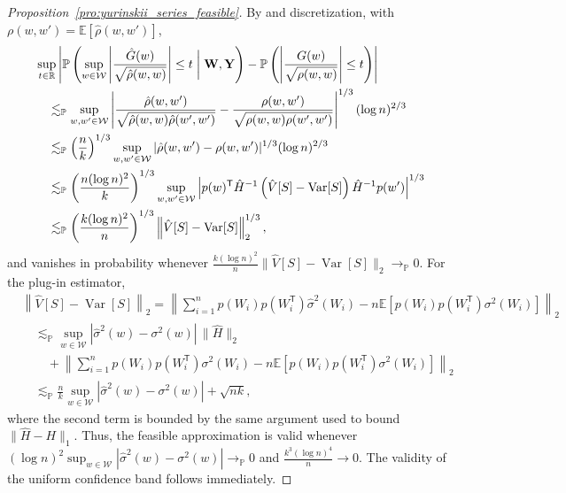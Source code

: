 \documentclass[11pt,lof]{puthesis}
\renewcommand{\P}{\ensuremath{\mathbb{P}}}
\newcommand{\R}{\ensuremath{\mathbb{R}}}
\newcommand{\E}{\ensuremath{\mathbb{E}}}
\newcommand{\bW}{\ensuremath{\mathbf{W}}}
\newcommand{\bY}{\ensuremath{\mathbf{Y}}}
\newcommand{\cW}{\ensuremath{\mathcal{W}}}
\newcommand{\T}{\ensuremath{\mathsf{T}}}
\DeclareMathOperator{\Var}{Var}
\theoremstyle{break}
\theoremstyle{proof}
\newtheorem{proof}{Proof}
\begin{document}
\begin{proof}[Proposition~\ref{pro:yurinskii_series_feasible}]
  By \citet[Lemma~3.1]{chernozhukov2013gaussian} and discretization,
  with $\rho(w,w') = \E[\hat\rho(w,w')]$,
  \begin{align*}
    &\sup_{t \in \R}
    \left|
    \P\left(
      \sup_{w \in \cW}
      \left|
      \frac{\hat G(w)}{\sqrt{\hat\rho(w,w)}}
      \right|
      \leq t \biggm| \bW, \bY
    \right)
    - \P\left(
      \left|
      \frac{G(w)}{\sqrt{\rho(w,w)}}
      \right|
      \leq t
    \right)
    \right| \\
    &\quad\lesssim_\P
    \sup_{w,w' \in \cW}
    \left|
    \frac{\hat\rho(w,w')}
    {\sqrt{\hat\rho(w,w)\hat\rho(w',w')}}
    - \frac{\rho(w,w')}
    {\sqrt{\rho(w,w)\rho(w',w')}}
    \right|^{1/3}
    (\log n)^{2/3} \\
    &\quad\lesssim_\P
    \left(\frac n k \right)^{1/3}
    \sup_{w,w' \in \cW} |\hat\rho(w,w') - \rho(w,w')|^{1/3}
    (\log n)^{2/3} \\
    &\quad\lesssim_\P
    \left( \frac{n (\log n)^2}{k} \right)^{1/3}
    \sup_{w,w' \in \cW}
    \left|
    p(w)^\T \hat H^{-1}
    \left(
      \hat{V}[S]
      - \Var[S]
    \right)
    \hat H^{-1} p(w')
    \right|^{1/3} \\
    &\quad\lesssim_\P
    \left( \frac{k (\log n)^2}{n} \right)^{1/3}
    \left\|
    \hat{V}[S]
    - \Var[S]
    \right\|_2^{1/3},
  \end{align*}
  and vanishes in probability whenever
  $\frac{k (\log n)^2}{n}
  \big\| \hat{V}[S] - \Var[S] \big\|_2 \to_\P 0$.
  For the plug-in estimator,
  \begin{align*}
    &\left\|
    \hat{V}[S]
    - \Var[S]
    \right\|_2
    =
    \left\|
    \sum_{i=1}^n
    p(W_i) p(W_i^\T)
    \hat\sigma^2(W_i)
    - n \E\left[
      p(W_i) p(W_i^\T)
      \sigma^2(W_i)
    \right]
    \right\|_2 \\
    &\quad\lesssim_\P
    \sup_{w \in \cW}
    |\hat{\sigma}^2(w)-\sigma^2(w)|
    \, \big\| \hat H \big\|_2 \\
    &\qquad+
    \left\|
    \sum_{i=1}^n
    p(W_i) p(W_i^\T)
    \sigma^2(W_i)
    - n \E\left[
      p(W_i) p(W_i^\T)
      \sigma^2(W_i)
    \right]
    \right\|_2 \\
    &\quad\lesssim_\P
    \frac{n}{k}
    \sup_{w \in \cW}
    |\hat{\sigma}^2(w)-\sigma^2(w)|
    + \sqrt{n k},
  \end{align*}
  where the second term is bounded by the same argument
  used to bound $\|\hat H - H\|_1$.
  Thus, the feasible approximation is valid whenever
  $(\log n)^2 \sup_{w \in \cW}
  |\hat{\sigma}^2(w)-\sigma^2(w)| \to_\P 0$
  and $\frac{k^3 (\log n)^4}{n} \to 0$.
  The validity of the uniform confidence band follows immediately.
\end{proof}
\end{document}
